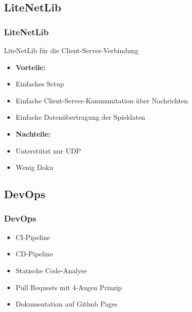 \documentclass{beamer}
\begin{document}
\subsection{LiteNetLib}
\begin{frame}
\frametitle{LiteNetLib}
  LiteNetLib für die Client-Server-Verbindung
  \begin{multicols}{2}
    \begin{itemize}
      \item \textbf{Vorteile:}
      \item Einfaches Setup
      \item Einfache Client-Server-Kommunitation über Nachrichten
      \item Einfache Datenübertragung der Spieldaten
    \end{itemize}
    \columnbreak
    \begin{itemize}
      \item \textbf{Nachteile:}
      \item Unterstützt nur UDP
      \item Wenig Doku
    \end{itemize}
  \end{multicols}
\end{frame}


\subsection{DevOps}
\begin{frame}
\frametitle{DevOps}
  \begin{itemize}
    \item CI-Pipeline
    \item CD-Pipeline
    \item Statische Code-Analyse
    \item Pull Requests mit 4-Augen Prinzip
    \item Dokumentation auf Github Pages
  \end{itemize}
\end{frame}
\end{document}
